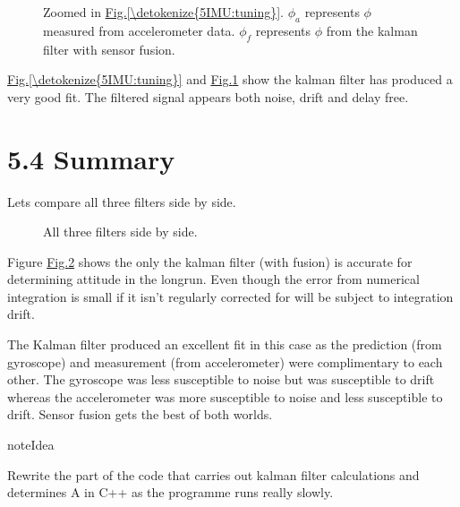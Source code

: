 \documentclass[letterpaper,10pt,english]{jupyterBook}
\begin{document}
\begin{figure}[htbp]
\centering
\capstart

\noindent{}
\caption{Zoomed in \hyperref[\detokenize{5IMU:tuning}]{Fig.\@ \ref{\detokenize{5IMU:tuning}}}. \(\phi_a\) represents \(\phi\) measured from accelerometer data. \(\phi_f\) represents \(\phi\) from the kalman filter with sensor fusion. }\label{\detokenize{5IMU:tuningzoomed}}\end{figure}

\sphinxAtStartPar
\hyperref[\detokenize{5IMU:tuning}]{Fig.\@ \ref{\detokenize{5IMU:tuning}}} and \hyperref[\detokenize{5IMU:tuningzoomed}]{Fig.\@ \ref{\detokenize{5IMU:tuningzoomed}}} show the kalman filter has produced a very good fit. The filtered signal appears both noise, drift and delay free.


\section{5.4 Summary}
\label{\detokenize{5IMU:summary}}
\sphinxAtStartPar
Lets compare all three filters side by side.

\begin{figure}[htbp]
\centering
\capstart

\noindent{}
\caption{All three filters side by side. }\label{\detokenize{5IMU:fig-comparison3}}\end{figure}

\sphinxAtStartPar
Figure \hyperref[\detokenize{5IMU:fig-comparison3}]{Fig.\@ \ref{\detokenize{5IMU:fig-comparison3}}} shows the only the kalman filter (with fusion) is accurate for determining attitude in the longrun. Even though the error from numerical integration is small if it isn’t regularly corrected for will be subject to integration drift.

\sphinxAtStartPar
The Kalman filter produced an excellent fit in this case as the prediction (from gyroscope) and measurement (from accelerometer) were complimentary to each other. The gyroscope was less susceptible to noise but was susceptible to drift whereas the accelerometer was more susceptible to noise and less susceptible to drift. Sensor fusion gets the best of both worlds.

\begin{sphinxadmonition}{note}{Idea}

\sphinxAtStartPar
Rewrite the part of the code that carries out kalman filter calculations and determines A in C++ as the programme runs really slowly.
\end{sphinxadmonition}
\end{document}

